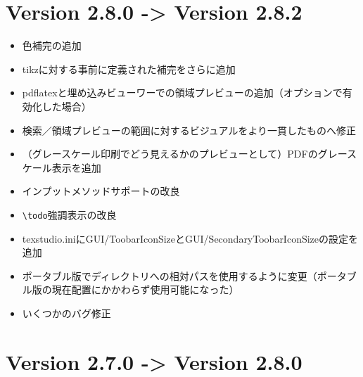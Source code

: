 \section{Version 2.8.0 -\textgreater{} Version 2.8.2}

\begin{itemize}
\item
  色補完の追加
\item
  tikzに対する事前に定義された補完をさらに追加
\item
  pdflatexと埋め込みビューワーでの領域プレビューの追加（オプションで有効化した場合）
\item
  検索／領域プレビューの範囲に対するビジュアルをより一貫したものへ修正
\item
  （グレースケール印刷でどう見えるかのプレビューとして）PDFのグレースケール表示を追加
\item
  インプットメソッドサポートの改良
\item
  \verb+\todo+強調表示の改良
\item
  texstudio.iniにGUI/ToobarIconSizeとGUI/SecondaryToobarIconSizeの設定を追加
\item
  ポータブル版でディレクトリへの相対パスを使用するように変更（ポータブル版の現在配置にかかわらず使用可能になった）
\item
  いくつかのバグ修正
\end{itemize}

\section{Version 2.7.0 -\textgreater{} Version 2.8.0}

